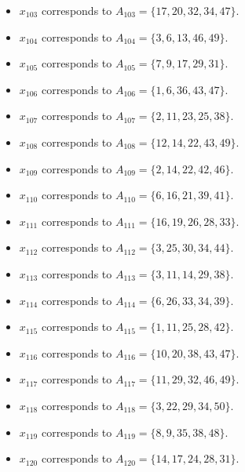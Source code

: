 \documentclass[11pt]{article}
\begin{document}
\begin{itemize}
\item $x_{103}$ corresponds to $A_{103}=\{17, 20, 32, 34, 47\}$.
\item $x_{104}$ corresponds to $A_{104}=\{3, 6, 13, 46, 49\}$.
\item $x_{105}$ corresponds to $A_{105}=\{7, 9, 17, 29, 31\}$.
\item $x_{106}$ corresponds to $A_{106}=\{1, 6, 36, 43, 47\}$.
\item $x_{107}$ corresponds to $A_{107}=\{2, 11, 23, 25, 38\}$.
\item $x_{108}$ corresponds to $A_{108}=\{12, 14, 22, 43, 49\}$.
\item $x_{109}$ corresponds to $A_{109}=\{2, 14, 22, 42, 46\}$.
\item $x_{110}$ corresponds to $A_{110}=\{6, 16, 21, 39, 41\}$.
\item $x_{111}$ corresponds to $A_{111}=\{16, 19, 26, 28, 33\}$.
\item $x_{112}$ corresponds to $A_{112}=\{3, 25, 30, 34, 44\}$.
\item $x_{113}$ corresponds to $A_{113}=\{3, 11, 14, 29, 38\}$.
\item $x_{114}$ corresponds to $A_{114}=\{6, 26, 33, 34, 39\}$.
\item $x_{115}$ corresponds to $A_{115}=\{1, 11, 25, 28, 42\}$.
\item $x_{116}$ corresponds to $A_{116}=\{10, 20, 38, 43, 47\}$.
\item $x_{117}$ corresponds to $A_{117}=\{11, 29, 32, 46, 49\}$.
\item $x_{118}$ corresponds to $A_{118}=\{3, 22, 29, 34, 50\}$.
\item $x_{119}$ corresponds to $A_{119}=\{8, 9, 35, 38, 48\}$.
\item $x_{120}$ corresponds to $A_{120}=\{14, 17, 24, 28, 31\}$.
\end{itemize}
\end{document}
